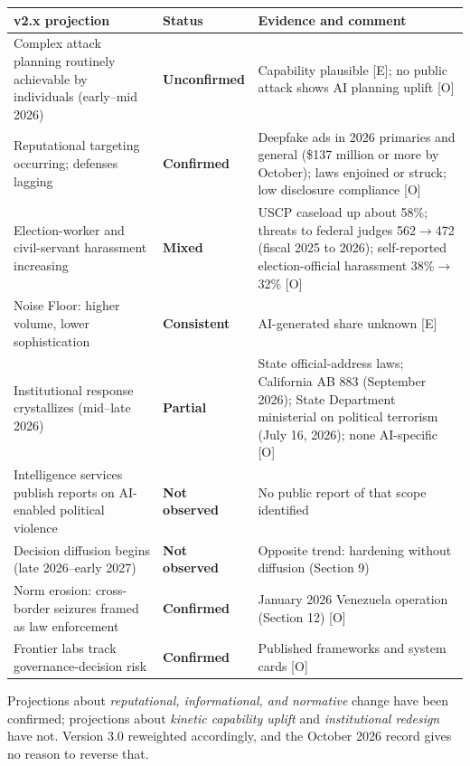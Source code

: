 \documentclass[11pt,letterpaper]{article}
\begin{document}
{\footnotesize
\begin{longtable}{L{5.4cm}L{2.6cm}L{6.4cm}}
\toprule
\textbf{v2.x projection} & \textbf{Status} & \textbf{Evidence and comment} \\
\midrule
\endhead
\bottomrule
\endlastfoot
Complex attack planning routinely achievable by individuals (early--mid 2026) & \textcolor{warningamber}{\textbf{Unconfirmed}} & Capability plausible [E]; no public attack shows AI planning uplift [O] \\
Reputational targeting occurring; defenses lagging & \textcolor{alertcoral}{\textbf{Confirmed}} & Deepfake ads in 2026 primaries and general (\$137 million or more by October); laws enjoined or struck; low disclosure compliance [O] \\
Election-worker and civil-servant harassment increasing & \textcolor{warningamber}{\textbf{Mixed}} & USCP caseload up about 58\%; threats to federal judges 562$\rightarrow$472 (fiscal 2025 to 2026); self-reported election-official harassment 38\%$\rightarrow$32\% [O] \\
Noise Floor: higher volume, lower sophistication & \textcolor{warningamber}{\textbf{Consistent}} & AI-generated share unknown [E] \\
Institutional response crystallizes (mid--late 2026) & \textcolor{warningamber}{\textbf{Partial}} & State official-address laws; California AB 883 (September 2026); State Department ministerial on political terrorism (July 16, 2026); none AI-specific [O] \\
Intelligence services publish reports on AI-enabled political violence & \textcolor{coolgray}{\textbf{Not observed}} & No public report of that scope identified \\
Decision diffusion begins (late 2026--early 2027) & \textcolor{coolgray}{\textbf{Not observed}} & Opposite trend: hardening without diffusion (Section 9) \\
Norm erosion: cross-border seizures framed as law enforcement & \textcolor{alertcoral}{\textbf{Confirmed}} & January 2026 Venezuela operation (Section 12) [O] \\
Frontier labs track governance-decision risk & \textcolor{alertcoral}{\textbf{Confirmed}} & Published frameworks and system cards [O] \\
\end{longtable}}

\begin{keybox}
Projections about \textit{reputational, informational, and normative} change have been confirmed; projections about \textit{kinetic capability uplift} and \textit{institutional redesign} have not. Version 3.0 reweighted accordingly, and the October 2026 record gives no reason to reverse that.
\end{keybox}
\end{document}
